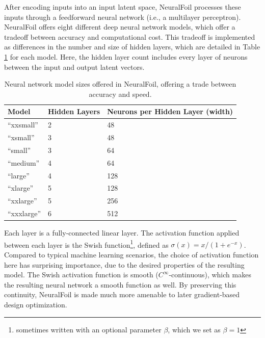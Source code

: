 \documentclass[journal]{new-aiaa}
\begin{document}
After encoding inputs into an input latent space, NeuralFoil processes these inputs through a feedforward neural network (i.e., a multilayer perceptron). NeuralFoil offers eight different deep neural network models, which offer a tradeoff between accuracy and computational cost. This tradeoff is implemented as differences in the number and size of hidden layers, which are detailed in Table \ref{tab:model-sizes} for each model. Here, the hidden layer count includes every layer of neurons between the input and output latent vectors.

\begin{table}[H]
    \centering
    \caption{Neural network model sizes offered in NeuralFoil, offering a trade between accuracy and speed.}
    \label{tab:model-sizes}
    \begin{tabular}{lll}
        \toprule
        Model        & Hidden Layers & Neurons per Hidden Layer (width) \\ \midrule
        ``xxsmall''  & 2             & 48                               \\
        ``xsmall''   & 3             & 48                               \\
        ``small''    & 3             & 64                               \\
        ``medium''   & 4             & 64                               \\
        ``large''    & 4             & 128                              \\
        ``xlarge''   & 5             & 128                              \\
        ``xxlarge''  & 5             & 256                              \\
        ``xxxlarge'' & 6             & 512                              \\
        \bottomrule
    \end{tabular}
\end{table}

Each layer is a fully-connected linear layer. The activation function applied between each layer is the Swish function\footnote{sometimes written with an optional parameter $\beta$, which we set as $\beta=1$}, defined as $\sigma(x)=x / (1 + e^{-x})$. Compared to typical machine learning scenarios, the choice of activation function here has surprising importance, due to the desired properties of the resulting model. The Swish activation function is smooth ($C^\infty$-continuous), which makes the resulting neural network a smooth function as well. By preserving this continuity, NeuralFoil is made much more amenable to later gradient-based design optimization.
\end{document}
